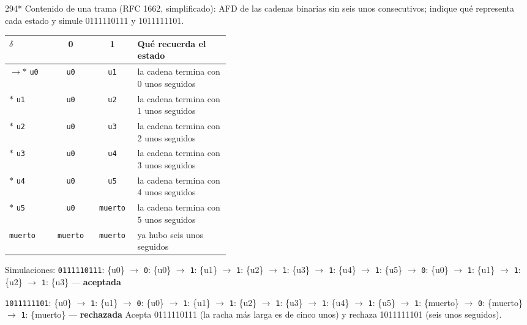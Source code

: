 \documentclass[11pt]{article}
\begin{document}
\begin{ejercicio}{294}{*}
Contenido de una trama (RFC 1662, simplificado): AFD de las cadenas binarias sin seis unos consecutivos; indique qué representa cada estado y simule 0111110111 y 1011111101.
\end{ejercicio}
\proc \begin{center}\small\begin{tabular}{lccp{0.42\linewidth}}\toprule
$\delta$ & 0 & 1 & Qué recuerda el estado \\\midrule
$\to$$*$ \texttt{u0} & \texttt{u0} & \texttt{u1} & la cadena termina con 0 unos seguidos \\
$*$ \texttt{u1} & \texttt{u0} & \texttt{u2} & la cadena termina con 1 unos seguidos \\
$*$ \texttt{u2} & \texttt{u0} & \texttt{u3} & la cadena termina con 2 unos seguidos \\
$*$ \texttt{u3} & \texttt{u0} & \texttt{u4} & la cadena termina con 3 unos seguidos \\
$*$ \texttt{u4} & \texttt{u0} & \texttt{u5} & la cadena termina con 4 unos seguidos \\
$*$ \texttt{u5} & \texttt{u0} & \texttt{muerto} & la cadena termina con 5 unos seguidos \\
 \texttt{muerto} & \texttt{muerto} & \texttt{muerto} & ya hubo seis unos seguidos \\
\bottomrule\end{tabular}\end{center}
Simulaciones: \texttt{0111110111}: \{u0\} $\to$ \texttt{0}: \{u0\} $\to$ \texttt{1}: \{u1\} $\to$ \texttt{1}: \{u2\} $\to$ \texttt{1}: \{u3\} $\to$ \texttt{1}: \{u4\} $\to$ \texttt{1}: \{u5\} $\to$ \texttt{0}: \{u0\} $\to$ \texttt{1}: \{u1\} $\to$ \texttt{1}: \{u2\} $\to$ \texttt{1}: \{u3\} — \textbf{aceptada}\par \texttt{1011111101}: \{u0\} $\to$ \texttt{1}: \{u1\} $\to$ \texttt{0}: \{u0\} $\to$ \texttt{1}: \{u1\} $\to$ \texttt{1}: \{u2\} $\to$ \texttt{1}: \{u3\} $\to$ \texttt{1}: \{u4\} $\to$ \texttt{1}: \{u5\} $\to$ \texttt{1}: \{muerto\} $\to$ \texttt{0}: \{muerto\} $\to$ \texttt{1}: \{muerto\} — \textbf{rechazada}
\resp Acepta 0111110111 (la racha más larga es de cinco unos) y rechaza 1011111101 (seis unos seguidos).
\end{document}
